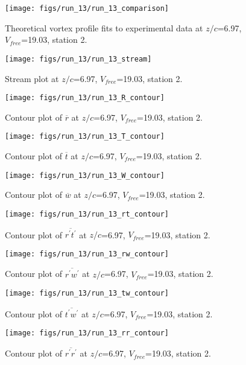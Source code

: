 \begin{figure}[H]
\centering
\texttt{[image: figs/run\_13/run\_13\_comparison]}
\caption{Theoretical vortex profile fits to experimental data at $z/c$=6.97, $V_{free}$=19.03, station 2.}
\end{figure}


\begin{figure}[H]
\centering
\texttt{[image: figs/run\_13/run\_13\_stream]}
\caption{Stream plot at $z/c$=6.97, $V_{free}$=19.03, station 2.}
\end{figure}


\begin{figure}[H]
\centering
\texttt{[image: figs/run\_13/run\_13\_R\_contour]}
\caption{Contour plot of $\overline{r}$ at $z/c$=6.97, $V_{free}$=19.03, station 2.}
\end{figure}


\begin{figure}[H]
\centering
\texttt{[image: figs/run\_13/run\_13\_T\_contour]}
\caption{Contour plot of $\overline{t}$ at $z/c$=6.97, $V_{free}$=19.03, station 2.}
\end{figure}


\begin{figure}[H]
\centering
\texttt{[image: figs/run\_13/run\_13\_W\_contour]}
\caption{Contour plot of $\overline{w}$ at $z/c$=6.97, $V_{free}$=19.03, station 2.}
\end{figure}


\begin{figure}[H]
\centering
\texttt{[image: figs/run\_13/run\_13\_rt\_contour]}
\caption{Contour plot of $\overline{r^\prime t^\prime}$ at $z/c$=6.97, $V_{free}$=19.03, station 2.}
\end{figure}


\begin{figure}[H]
\centering
\texttt{[image: figs/run\_13/run\_13\_rw\_contour]}
\caption{Contour plot of $\overline{r^\prime w^\prime}$ at $z/c$=6.97, $V_{free}$=19.03, station 2.}
\end{figure}


\begin{figure}[H]
\centering
\texttt{[image: figs/run\_13/run\_13\_tw\_contour]}
\caption{Contour plot of $\overline{t^\prime w^\prime}$ at $z/c$=6.97, $V_{free}$=19.03, station 2.}
\end{figure}


\begin{figure}[H]
\centering
\texttt{[image: figs/run\_13/run\_13\_rr\_contour]}
\caption{Contour plot of $\overline{r^\prime r^\prime}$ at $z/c$=6.97, $V_{free}$=19.03, station 2.}
\end{figure}


